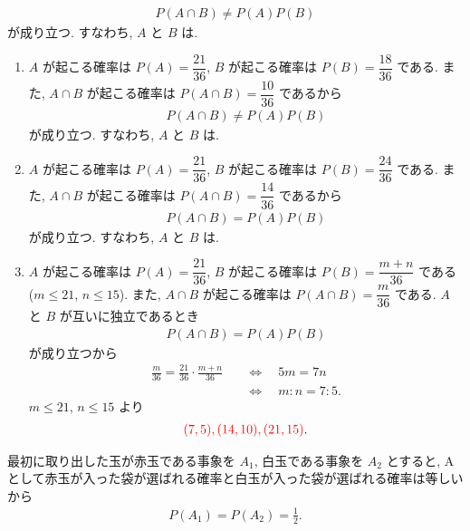 \begin{qenumerate}
{\begin{enumerate}
{				\begin{align}
					P(A\cap B) \neq P(A)P(B)
				\end{align}
				が成り立つ.
				すなわち, $A$ と $B$ は.
			}
		\end{enumerate}
	}
	\item{
		\begin{enumerate}
			\item{
				$A$ が起こる確率は $P(A) = \dfrac{21}{36}$, $B$ が起こる確率は $P(B) = \dfrac{18}{36}$ である.
				また, $A\cap B$ が起こる確率は $P(A\cap B) = \dfrac{10}{36}$ であるから
				\begin{align}
					P(A\cap B) \neq P(A)P(B)
				\end{align}
				が成り立つ.
				すなわち, $A$ と $B$ は.
			}
			\item{
				$A$ が起こる確率は $P(A) = \dfrac{21}{36}$, $B$ が起こる確率は $P(B) = \dfrac{24}{36}$ である.
				また, $A\cap B$ が起こる確率は $P(A\cap B) = \dfrac{14}{36}$ であるから
				\begin{align}
					P(A\cap B) = P(A)P(B)
				\end{align}
				が成り立つ.
				すなわち, $A$ と $B$ は.
			}
			\item{
				$A$ が起こる確率は $P(A) = \dfrac{21}{36}$, $B$ が起こる確率は $P(B) = \dfrac{m + n}{36}$ である ($m\leq 21$, $n\leq15$).
				また, $A\cap B$ が起こる確率は $P(A\cap B) = \dfrac{m}{36}$ である.
				$A$ と $B$ が互いに独立であるとき
				\begin{align}
					P(A\cap B) = P(A)P(B)
				\end{align}
				が成り立つから
				\begin{align}
					\frac{m}{36} = \frac{21}{36}\cdot\frac{m + n}{36} \quad&\Leftrightarrow\quad 5m = 7n \\
						&\Leftrightarrow\quad m:n = 7:5.
				\end{align}
				$m\leq 21$, $n\leq15$ より
				\begin{align}
					\textcolor{red}{(7, 5), (14, 10), (21, 15)}.
				\end{align}
			}
		\end{enumerate}
	}
	\item{
		最初に取り出した玉が赤玉である事象を $A_{1}$, 白玉である事象を $A_{2}$ とすると, A として赤玉が入った袋が選ばれる確率と白玉が入った袋が選ばれる確率は等しいから
		\begin{align}
			P\left(A_{1}\right) = P\left(A_{2}\right) = \frac{1}{2}.
		\end{align}
}
\end{qenumerate}
